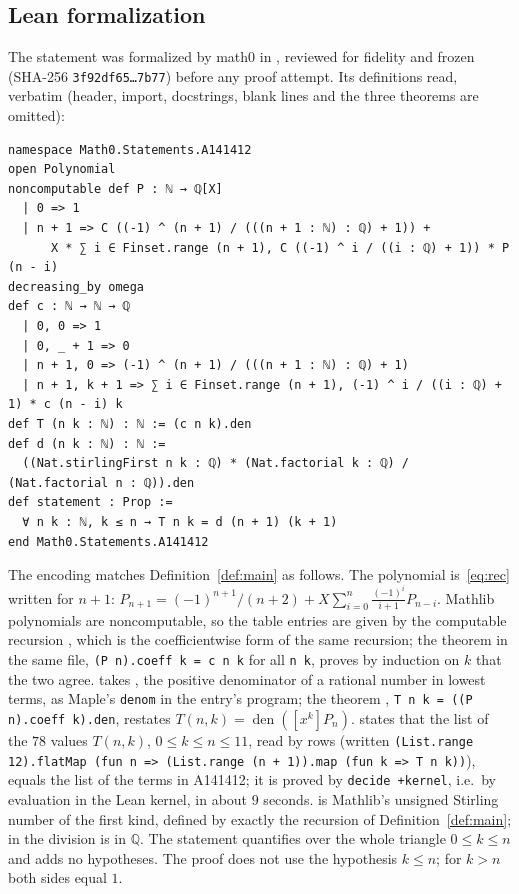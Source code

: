 \documentclass[11pt]{amsart}
\theoremstyle{plain}
\theoremstyle{definition}
\newcommand{\Q}{\mathbb{Q}}
\newcommand{\den}{\operatorname{den}}
\begin{document}
\subsection*{Lean formalization}
The statement was formalized by math0 in , reviewed for fidelity and frozen (SHA-256 \texttt{3f92df65\ldots7b77}) before any proof attempt. Its definitions read, verbatim (header, import, docstrings, blank lines and the three theorems are omitted):
\begin{lstlisting}
namespace Math0.Statements.A141412
open Polynomial
noncomputable def P : ℕ → ℚ[X]
  | 0 => 1
  | n + 1 => C ((-1) ^ (n + 1) / (((n + 1 : ℕ) : ℚ) + 1)) +
      X * ∑ i ∈ Finset.range (n + 1), C ((-1) ^ i / ((i : ℚ) + 1)) * P (n - i)
decreasing_by omega
def c : ℕ → ℕ → ℚ
  | 0, 0 => 1
  | 0, _ + 1 => 0
  | n + 1, 0 => (-1) ^ (n + 1) / (((n + 1 : ℕ) : ℚ) + 1)
  | n + 1, k + 1 => ∑ i ∈ Finset.range (n + 1), (-1) ^ i / ((i : ℚ) + 1) * c (n - i) k
def T (n k : ℕ) : ℕ := (c n k).den
def d (n k : ℕ) : ℕ :=
  ((Nat.stirlingFirst n k : ℚ) * (Nat.factorial k : ℚ) / (Nat.factorial n : ℚ)).den
def statement : Prop :=
  ∀ n k : ℕ, k ≤ n → T n k = d (n + 1) (k + 1)
end Math0.Statements.A141412
\end{lstlisting}
The encoding matches Definition~\ref{def:main} as follows.
The polynomial  is~\eqref{eq:rec} written for $n+1$: $P_{n+1}=(-1)^{n+1}/(n+2)+X\sum_{i=0}^{n}\frac{(-1)^i}{i+1}P_{n-i}$. Mathlib polynomials are noncomputable, so the table entries are given by the computable recursion , which is the coefficientwise form of the same recursion; the theorem  in the same file, \texttt{(P n).coeff k = c n k} for all \texttt{n k}, proves by induction on $k$ that the two agree.
 takes , the positive denominator of a rational number in lowest terms, as Maple's \texttt{denom} in the entry's program; the theorem , \texttt{T n k = ((P n).coeff k).den}, restates $T(n,k)=\den([x^k]P_n)$.
 states that the list of the $78$ values $T(n,k)$, $0\le k\le n\le 11$, read by rows (written \texttt{(List.range 12).flatMap (fun n => (List.range (n + 1)).map (fun k => T n k))}), equals the list of the terms in A141412; it is proved by \texttt{decide +kernel}, i.e.\ by evaluation in the Lean kernel, in about $9$ seconds.
 is Mathlib's unsigned Stirling number of the first kind, defined by exactly the recursion of Definition~\ref{def:main}; in  the division is in $\Q$.
The statement quantifies over the whole triangle $0\le k\le n$ and adds no hypotheses. The proof does not use the hypothesis $k\le n$; for $k>n$ both sides equal $1$.
\end{document}
